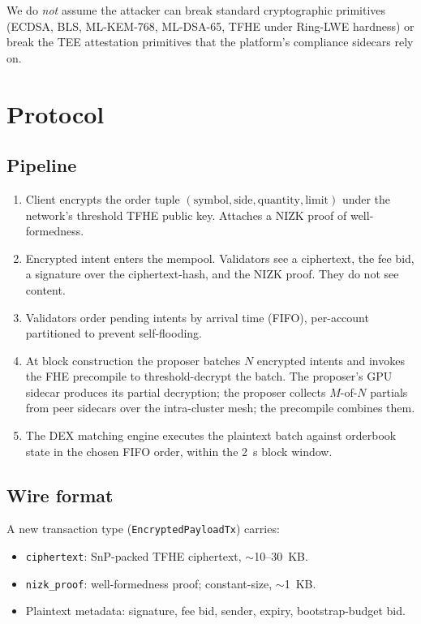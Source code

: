 \documentclass[11pt,a4paper]{article}
\begin{document}
\noindent We do \emph{not} assume the attacker can break standard
cryptographic primitives (ECDSA, BLS, ML-KEM-768, ML-DSA-65, TFHE
under Ring-LWE hardness) or break the TEE attestation primitives
that the platform's compliance sidecars rely on.

\section{Protocol}

\subsection{Pipeline}

\begin{enumerate}[nosep,label=\textbf{P\arabic*.}]
\item Client encrypts the order tuple
  $(\text{symbol}, \text{side}, \text{quantity}, \text{limit})$
  under the network's threshold TFHE public key. Attaches a NIZK
  proof of well-formedness.
\item Encrypted intent enters the mempool. Validators see a
  ciphertext, the fee bid, a signature over the
  ciphertext-hash, and the NIZK proof. They do not see content.
\item Validators order pending intents by arrival time (FIFO),
  per-account partitioned to prevent self-flooding.
\item At block construction the proposer batches $N$ encrypted
  intents and invokes the FHE precompile to threshold-decrypt
  the batch. The proposer's GPU sidecar produces its partial
  decryption; the proposer collects $M$-of-$N$ partials from peer
  sidecars over the intra-cluster mesh; the precompile combines
  them.
\item The DEX matching engine executes the plaintext batch
  against orderbook state in the chosen FIFO order, within the
  2~s block window.
\end{enumerate}

\subsection{Wire format}

A new transaction type (\texttt{EncryptedPayloadTx}) carries:

\begin{itemize}[nosep]
\item \texttt{ciphertext}: SnP-packed TFHE ciphertext, $\sim$10--30~KB.
\item \texttt{nizk\_proof}: well-formedness proof; constant-size,
  $\sim$1~KB.
\item Plaintext metadata: signature, fee bid, sender, expiry,
  bootstrap-budget bid.
\end{itemize}
\end{document}
